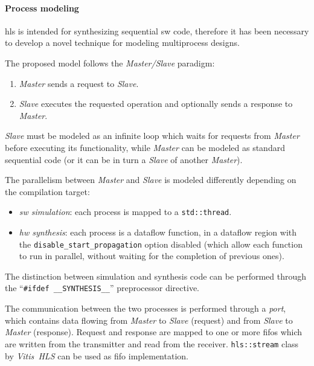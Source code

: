 \documentclass[11pt,a4paper,oneside]{memoir}
\begin{document}
\paragraph{Process modeling}
\ac{hls} is intended for synthesizing sequential \acl{sw} code, therefore it has
been necessary to develop a novel technique for modeling multiprocess designs.

The proposed model follows the \emph{Master/Slave} paradigm:
\begin{enumerate}
	\item \emph{Master} sends a request to \emph{Slave}.
	\item \emph{Slave} executes the requested operation and optionally sends
		a response to \emph{Master}.
\end{enumerate}

\emph{Slave} must be modeled as an infinite loop which waits for requests from
\emph{Master} before executing its functionality, while \emph{Master} can be
modeled as standard sequential code (or it can be in turn a \emph{Slave} of
another \emph{Master}).

The parallelism between \emph{Master} and \emph{Slave} is modeled differently
depending on the compilation target:
\begin{itemize}
	\item \emph{\ac{sw} simulation}: each process is mapped to a
		\texttt{std::thread}.
	\item \emph{\ac{hw} synthesis}: each process is a dataflow function, in
		a dataflow region with the \texttt{disable\_start\_propagation}
		option disabled (which allow each function to run in parallel,
		without waiting for the completion of previous ones).
\end{itemize}
The distinction between simulation and synthesis code can be performed through
the ``\texttt{\#ifdef \_\_SYNTHESIS\_\_}'' preprocessor directive.

The communication between the two processes is performed through a \emph{port},
which contains data flowing from \emph{Master} to \emph{Slave} (request) and
from \emph{Slave} to \emph{Master} (response).
Request and response are mapped to one or more \acp{fifo} which are written
from the transmitter and read from the receiver.
\texttt{hls::stream} class by \emph{Vitis\texttrademark~HLS} can be used as
\ac{fifo} implementation.
\end{document}
